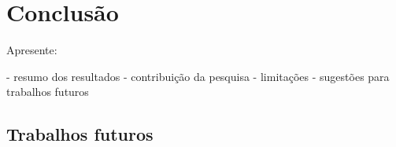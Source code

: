\chapter{Conclusão}
\label{cap:conclusao}
Apresente:

- resumo dos resultados
- contribuição da pesquisa
- limitações
- sugestões para trabalhos futuros

\section{Trabalhos futuros}